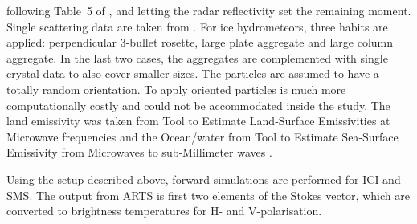 \documentclass[amt, manuscript]{copernicus}
\begin{document}
following Table~5 of \citet{delanoe2014normalized}, and letting the radar reflectivity set the remaining moment. Single scattering data are taken from
\citet{eriksson:agene:18}. For ice hydrometeors, three habits are applied:
perpendicular 3-bullet rosette, large plate aggregate and large column
aggregate. In the last two cases, the aggregates are complemented with single crystal data to also cover smaller sizes. The particles are assumed to have a totally random orientation. 
To apply oriented particles is much more computationally costly and could not be accommodated inside the study. The land emissivity was taken from Tool to Estimate Land‐Surface Emissivities at Microwave frequencies \citep[TELSEM,][]{aires2011tool} and the
Ocean/water from Tool to Estimate Sea‐Surface Emissivity from Microwaves to sub‐Millimeter waves \citep[TESSEM,][]{prigent2017sea}.

Using the setup described above, forward simulations are performed for ICI and SMS. The output from ARTS is first two elements of the Stokes vector,  which are converted to brightness temperatures for H- and V-polarisation. 
\end{document}

